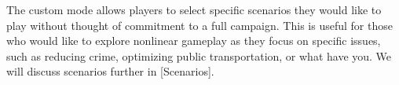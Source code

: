 
The custom mode allows players to select specific scenarios they would like to play without thought of commitment to a full campaign. This is useful for those who would like to explore nonlinear gameplay as they focus on specific issues, such as reducing crime, optimizing public transportation, or what have you. We will discuss scenarios further in [Scenarios].

